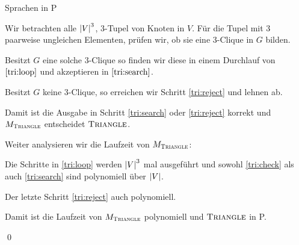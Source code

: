 \documentclass[answers]{submit}
\begin{document}
\begin{exercise}[6]{Sprachen in P}
{    Wir betrachten alle $\left\vert V \right\vert^3$, $3$-Tupel von Knoten in $V$.
    Für die Tupel mit 3 paarweise ungleichen Elementen, prüfen wir, ob sie eine $3$-Clique in $G$ bilden.

    Besitzt $G$ eine solche $3$-Clique so finden wir diese in einem Durchlauf von $\ref{tri:loop}$ und akzeptieren in $\ref{tri:search}$.

    Besitzt $G$ keine $3$-Clique, so erreichen wir Schritt \ref{tri:reject} und lehnen ab.

    Damit ist die Ausgabe in Schritt \ref{tri:search} oder \ref{tri:reject} korrekt und $M_{\textsc{Triangle}}$ entscheidet $\textsc{Triangle}$.

    \vspace{0.2cm}

    Weiter analysieren wir die Laufzeit von $M_{\textsc{Triangle}}$:

    Die Schritte in \ref{tri:loop} werden $\left\vert V \right\vert^3$ mal ausgeführt und sowohl \ref{tri:check} als auch \ref{tri:search} sind polynomiell über $\left\vert V \right\vert$.

    Der letzte Schritt \ref{tri:reject} auch polynomiell.

    Damit ist die Laufzeit von $M_{\textsc{Triangle}}$ polynomiell und $\textsc{Triangle}$ in P.

    \qed
  }
\end{exercise}
\end{document}
